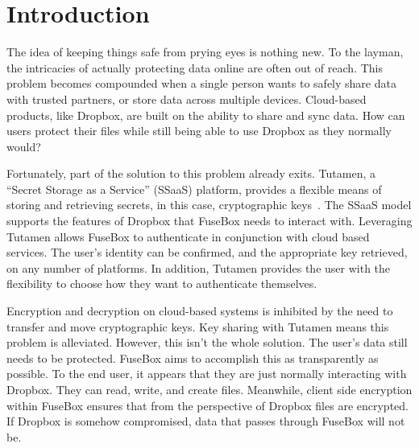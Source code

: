 \documentclass[11pt,twocolumn,letterpaper]{article}
\newcommand{\appname}{FuseBox }
\newcommand{\custos}{Tutamen }
\newcommand{\custosWOspace}{Tutamen}
\begin{document}
\section{Introduction}
\label{sec:intro}
The idea of keeping things safe from prying eyes is nothing new.
To the layman, the intricacies of
actually protecting data online are often out of reach. This problem
becomes compounded when a single person wants to safely share data
with trusted partners, or store data across multiple devices.
Cloud-based products, like Dropbox, are built
on the ability to share and sync data. How can users protect their
files while still being able to use Dropbox as they normally would? 
\par Fortunately, part of the solution to this problem already exits.
\custosWOspace, a ``Secret Storage as a Service'' (SSaaS) platform, 
provides a flexible means of storing and
retrieving secrets, in this case, cryptographic
keys~\cite{custostrios}. 
The SSaaS model supports the features of
Dropbox that \appname needs to interact with. Leveraging \custos allows \appname to 
authenticate in conjunction with cloud based services. The user's
identity can be confirmed, and the appropriate key retrieved, on any number
of platforms. In addition, \custos provides the user with the 
flexibility to choose how they want to authenticate themselves. 
\par Encryption and decryption on cloud-based systems is inhibited by
the need to transfer and move cryptographic keys. Key sharing 
with \custos means this problem is alleviated. However, this isn't the
whole solution. The user's data still needs to be protected.
\appname aims to accomplish this as transparently as
possible. To the end user, it appears that they are just normally
interacting with Dropbox. They can read, write, and create
files. Meanwhile, client side encryption within \appname
ensures that from the perspective of Dropbox files are encrypted.
If Dropbox is somehow compromised, data that passes through \appname
will not be.    
\end{document}
